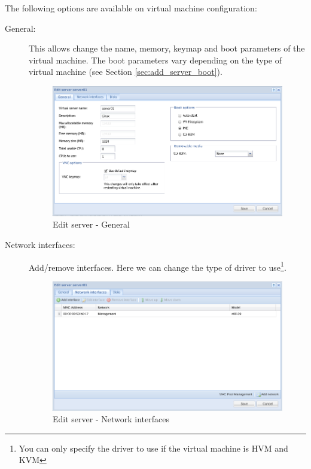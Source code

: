 The following options are available on virtual machine configuration:
\begin{description}
	\item[General:] This allows change the name, memory, keymap and boot parameters of the virtual machine.
        The boot parameters vary depending on the type of virtual machine (see Section \ref{sec:add_server_boot}).
		\begin{figure}[H]
        		\begin{center}
		        \includegraphics[scale=0.5]{screenshots/server_edit_general.png}
        		\caption{Edit server - General}
	        	\label{fig:server_edit_general}
	        	\end{center}
		\end{figure}

	\item[Network interfaces:] Add/remove interfaces. Here we can change the type of driver to use\footnote{You can only specify the driver to use if the virtual machine is HVM and KVM}.
		\begin{figure}[H]
        		\begin{center}
		        \includegraphics[scale=0.5]{screenshots/server_edit_interfaces.png}
        		\caption{Edit server - Network interfaces}
	        	\label{fig:server_edit_interfaces}
	        	\end{center}
		\end{figure}


\end{description}
